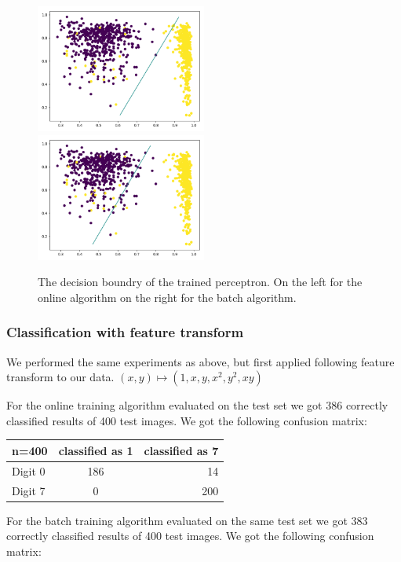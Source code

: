 \begin{figure}
\includegraphics[width = 0.5\textwidth]{figures/decision_simple_online}
\includegraphics[width = 0.5\textwidth]{figures/decision_simple_batch}
\caption{The decision boundry of the trained perceptron. On the left for the online algorithm on the right for the batch algorithm.}
\label{perceptron:decision:simple}
\end{figure}

\subsubsection{Classification with feature transform}
We performed the same experiments as above, but first applied following feature transform to our data. $(x,y)\mapsto (1,x,y,x^2,y^2,xy)$

For the online training algorithm evaluated on the test set we got 386 correctly classified results of 400 test images. We got the following confusion matrix:

\begin{tabular}{ l | c | r }
\centering
  n=400 & classified as 1 & classified as 7 \\ \hline
  Digit 0 & 186 & 14 \\
  Digit 7 & 0 & 200 \\
\end{tabular}

For the batch training algorithm evaluated on the same test set we got 383 correctly classified results of 400 test images. We got the following confusion matrix:

